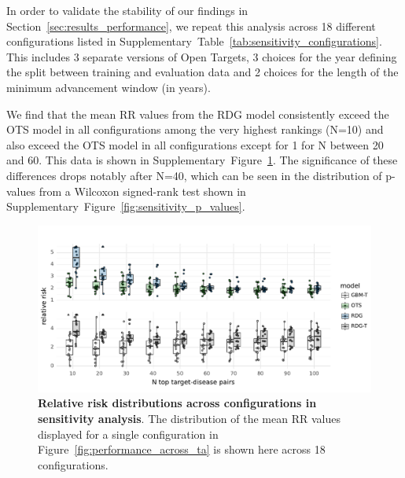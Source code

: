 \documentclass{article}
\begin{document}
In order to validate the stability of our findings in Section~\ref{sec:results_performance}, we repeat this analysis across 18 different configurations listed in Supplementary~Table~\ref{tab:sensitivity_configurations}. This includes 3 separate versions of Open Targets, 3 choices for the year defining the split between training and evaluation data and 2 choices for the length of the minimum advancement window (in years).

We find that the mean RR values from the RDG model consistently exceed the OTS model in all configurations among the very highest rankings (N=10) and also exceed the OTS model in all configurations except for 1 for N between 20 and 60. This data is shown in Supplementary~Figure~\ref{fig:sensitivity_relative_risk}. The significance of these differences drops notably after N=40, which can be seen in the distribution of p-values from a Wilcoxon signed-rank test shown in Supplementary~Figure~\ref{fig:sensitivity_p_values}.



\clearpage

\begin{figure}[H]
  \centering
  \captionsetup{width=.9\linewidth}
  \includegraphics[width=1\textwidth]{sensitivity_relative_risk.pdf}
  \caption{
    \textbf{Relative risk distributions across configurations in sensitivity analysis}.
    The distribution of the mean RR values displayed for a single configuration in Figure~\ref{fig:performance_across_ta} is shown here across 18 configurations.
  }
  \label{fig:sensitivity_relative_risk}
\end{figure}

\pagebreak
\end{document}
